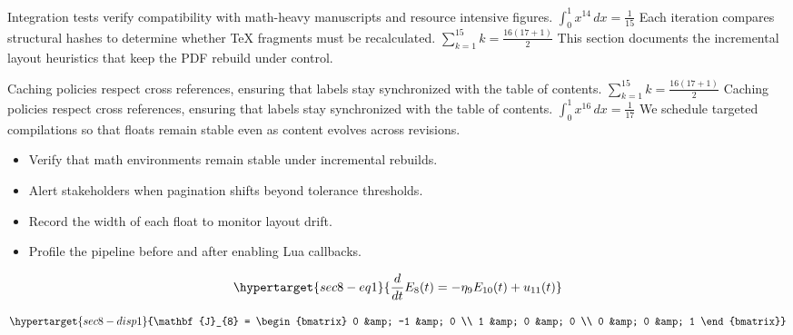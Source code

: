 \documentclass[12pt,a4paper,twocolumn]{article}
\newcommand{\paraid}[1]{\par\noindent\hypertarget{#1}{\ignorespaces}}
\begin{document}
\paraid{sec8-p6}Integration tests verify compatibility with math-heavy manuscripts and resource intensive figures. $\int_{0}^{1} x^{14} \, dx = \frac{1}{15}$ Each iteration compares structural hashes to determine whether TeX fragments must be recalculated. $\sum_{k=1}^{15} k = \frac{16(17+1)}{2}$ This section documents the incremental layout heuristics that keep the PDF rebuild under control.
\par

\paraid{sec8-p7}Caching policies respect cross references, ensuring that labels stay synchronized with the table of contents. $\sum_{k=1}^{15} k = \frac{16(17+1)}{2}$ Caching policies respect cross references, ensuring that labels stay synchronized with the table of contents. $\int_{0}^{1} x^{16} \, dx = \frac{1}{17}$ We schedule targeted compilations so that floats remain stable even as content evolves across revisions.
\par

\begin{itemize}

\item 
        Verify that math environments remain stable under incremental rebuilds.
      

\item 
        Alert stakeholders when pagination shifts beyond tolerance thresholds.
      

\item 
        Record the width of each float to monitor layout drift.
      

\item 
        Profile the pipeline before and after enabling Lua callbacks.
      

\end{itemize}

\begin{equation}
\hypertarget{sec8-eq1}{\frac{d}{dt} E_{8}(t) = -\eta_{9} E_{10}(t) + u_{11}(t)}
\label{eq:sec8-eq1}
\end{equation}

\[
\hypertarget{sec8-disp1}{\mathbf{J}_{8} = \begin{bmatrix} 0 &amp; -1 &amp; 0 \\ 1 &amp; 0 &amp; 0 \\ 0 &amp; 0 &amp; 1 \end{bmatrix}}
\]
\end{document}
